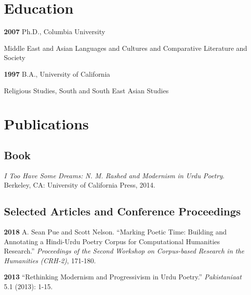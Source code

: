\documentclass[letterpaper,12pt]{article}
\newenvironment{DUlineblock}[1]{%
    \list{}{\setlength{\partopsep}{\parskip}
            \addtolength{\partopsep}{\baselineskip}
            \setlength{\topsep}{0pt}
            \setlength{\itemsep}{0.15\baselineskip}
            \setlength{\parsep}{0pt}
            \setlength{\leftmargin}{#1}}
    \raggedright
  }
  {\endlist}
\begin{document}
\section{Education%
  \label{education}%
}

\begin{DUlineblock}{0em}
\item[] \textbf{2007}
Ph.D., Columbia University
\item[]
\begin{DUlineblock}{\DUlineblockindent}
\item[] Middle East and Asian Languages and Cultures and Comparative Literature and Society
\end{DUlineblock}
\item[] \textbf{1997}
B.A., University of California
\item[]
\begin{DUlineblock}{\DUlineblockindent}
\item[] Religious Studies, South and South East Asian Studies
\end{DUlineblock}
\end{DUlineblock}


\section{Publications%
  \label{publications}%
}


\subsection{Book%
  \label{book}%
}

\emph{I Too Have Some Dreams: N. M. Rashed and Modernism in Urdu Poetry}.
Berkeley, CA: University of California Press, 2014.


\subsection{Selected Articles and Conference Proceedings%
  \label{selected-articles-and-conference-proceedings}%
}

\textbf{2018}
A. Sean Pue and Scott Nelson.
“Marking Poetic Time: Building and Annotating a Hindi-Urdu Poetry Corpus for Computational Humanities Research.”
\emph{Proceedings of the Second Workshop on Corpus-based Research in the Humanities (CRH-2)}, 171-180.

\textbf{2013}
“Rethinking Modernism and Progressivism in Urdu Poetry.”
\emph{Pakistaniaat} 5.1 (2013): 1-15.
\end{document}

